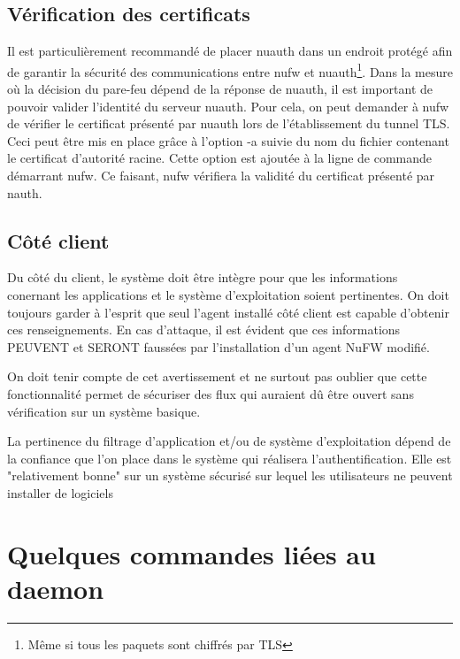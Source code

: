 \documentclass[12pt]{report}
\begin{document}
\begin{itemize}
\subsection{Vérification des certificats}
Il est particulièrement recommandé de placer nuauth dans un endroit protégé afin de garantir la sécurité
des communications entre nufw et nuauth\footnote{Même si tous les paquets sont chiffrés par TLS}. 
Dans la mesure où la décision du pare-feu dépend de la réponse de nuauth, il est important de pouvoir 
valider l’identité du serveur nuauth. Pour cela, on peut demander à nufw de vérifier le certificat présenté 
par nuauth lors de l’établissement du tunnel TLS. Ceci peut être mis en place grâce à l’option -a suivie du nom 
du fichier contenant le certificat d’autorité racine. Cette option est ajoutée à la ligne de commande démarrant nufw. 
Ce faisant, nufw vérifiera la validité du certificat présenté par nauth.

\subsection{Côté client}
Du côté du client, le système doit être intègre pour que les informations conernant les applications et le
système d’exploitation soient pertinentes. On doit toujours garder à l’esprit que seul l’agent installé
côté client est capable d’obtenir ces renseignements. En cas d’attaque, il est évident que ces informations
PEUVENT et SERONT faussées par l’installation d’un agent NuFW modifié.

On doit tenir compte de cet avertissement et ne surtout pas oublier que cette
fonctionnalité permet de sécuriser des flux qui auraient dû être ouvert sans vérification sur un système
basique.

La pertinence du filtrage d’application et/ou de système d’exploitation dépend de la confiance que l'on
place dans le système qui réalisera l’authentification. Elle est "relativement bonne" sur un système
sécurisé sur lequel les utilisateurs ne peuvent installer de logiciels

\section{Quelques commandes liées au daemon}


\end{itemize}
\end{document}
